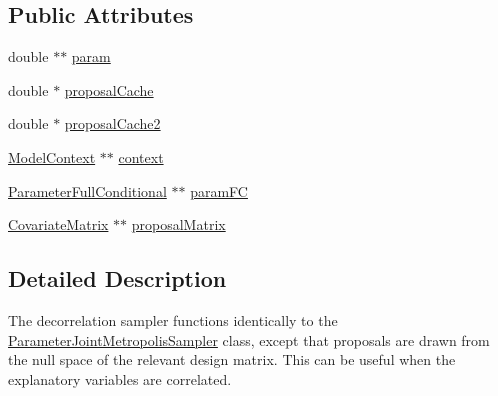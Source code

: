 \subsection*{Public Attributes}
\begin{DoxyCompactItemize}
\item 
double $\ast$$\ast$ \hyperlink{classSpatialSEIR_1_1ParameterDecorrelationSampler_a4861d8e4ed1613da5b636535b1878ff5}{param}
\item 
double $\ast$ \hyperlink{classSpatialSEIR_1_1ParameterDecorrelationSampler_a11fa351008038a247d6d4277a1e4dfe7}{proposal\-Cache}
\item 
double $\ast$ \hyperlink{classSpatialSEIR_1_1ParameterDecorrelationSampler_a4aee4558ad58aec311e280512acc8796}{proposal\-Cache2}
\item 
\hyperlink{classSpatialSEIR_1_1ModelContext}{Model\-Context} $\ast$$\ast$ \hyperlink{classSpatialSEIR_1_1ParameterDecorrelationSampler_a6d3abd37e28042269b7e46bd1dbf45f6}{context}
\item 
\hyperlink{classSpatialSEIR_1_1ParameterFullConditional}{Parameter\-Full\-Conditional} $\ast$$\ast$ \hyperlink{classSpatialSEIR_1_1ParameterDecorrelationSampler_a68fd577ec24b82e53d6f0e3db8227642}{param\-F\-C}
\item 
\hyperlink{classSpatialSEIR_1_1CovariateMatrix}{Covariate\-Matrix} $\ast$$\ast$ \hyperlink{classSpatialSEIR_1_1ParameterDecorrelationSampler_afacba79f68960c5f287fe7551d39cb28}{proposal\-Matrix}
\end{DoxyCompactItemize}


\subsection{Detailed Description}
The decorrelation sampler functions identically to the \hyperlink{classSpatialSEIR_1_1ParameterJointMetropolisSampler}{Parameter\-Joint\-Metropolis\-Sampler} class, except that proposals are drawn from the null space of the relevant design matrix. This can be useful when the explanatory variables are correlated. 

